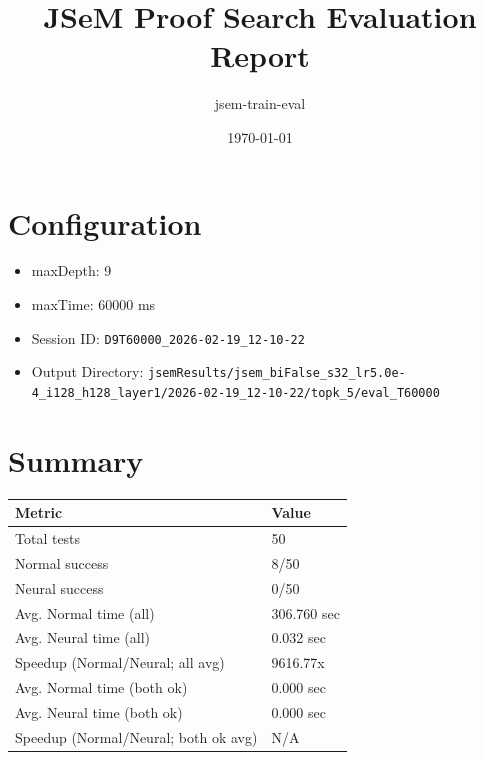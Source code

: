 \documentclass[a4paper,10pt]{article}
\title{JSeM Proof Search Evaluation Report}
\author{jsem-train-eval}
\date{\today}
\begin{document}
\maketitle

\section{Configuration}
\begin{itemize}
\item maxDepth: 9
\item maxTime: 60000 ms
\item Session ID: \texttt{D9T60000\_2026-02-19\_12-10-22}
\item Output Directory: \texttt{jsemResults/jsem\_biFalse\_s32\_lr5.0e-4\_i128\_h128\_layer1/2026-02-19\_12-10-22/topk\_5/eval\_T60000}
\end{itemize}

\section{Summary}
\begin{tabular}{ll}
\toprule
\textbf{Metric} & \textbf{Value} \\
\midrule
Total tests & 50 \\
Normal success & 8/50 \\
Neural success & 0/50 \\
\midrule
Avg. Normal time (all) & 306.760 sec \\
Avg. Neural time (all) & 0.032 sec \\
Speedup (Normal/Neural; all avg) & 9616.77x \\
Avg. Normal time (both ok) & 0.000 sec \\
Avg. Neural time (both ok) & 0.000 sec \\
Speedup (Normal/Neural; both ok avg) & N/A \\
\bottomrule
\end{tabular}
\end{document}
